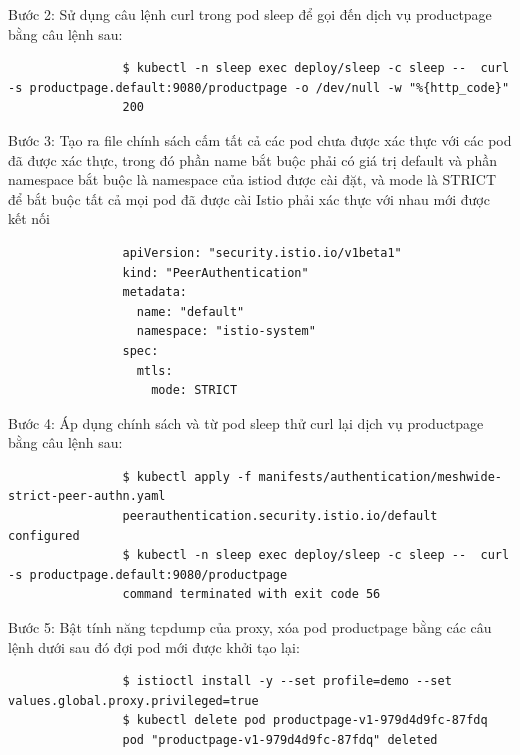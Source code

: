 \documentclass[12pt,a4paper]{report}
\begin{document}
{{				Bước 2: Sử dụng câu lệnh curl trong pod sleep để gọi đến dịch vụ productpage bằng câu lệnh sau:
				\begin{lstlisting}
				$ kubectl -n sleep exec deploy/sleep -c sleep --  curl -s productpage.default:9080/productpage -o /dev/null -w "%{http_code}"
				200
				\end{lstlisting}
				
				Bước 3: Tạo ra file chính sách cấm tất cả các pod chưa được xác thực với các pod đã được xác thực, trong đó phần name bắt buộc phải có giá trị default và phần namespace bắt buộc là namespace của istiod được cài đặt, và mode là STRICT để bắt buộc tất cả mọi pod đã được cài Istio phải xác thực với nhau mới được kết nối
				\begin{lstlisting}
				apiVersion: "security.istio.io/v1beta1"
				kind: "PeerAuthentication"
				metadata:
				  name: "default"
				  namespace: "istio-system"
				spec:
			 	  mtls:
				    mode: STRICT 
				\end{lstlisting}
				
				Bước 4: Áp dụng chính sách và từ pod sleep thử curl lại dịch vụ productpage bằng câu lệnh sau:
				\begin{lstlisting}
				$ kubectl apply -f manifests/authentication/meshwide-strict-peer-authn.yaml 
				peerauthentication.security.istio.io/default configured
				$ kubectl -n sleep exec deploy/sleep -c sleep --  curl -s productpage.default:9080/productpage
				command terminated with exit code 56
				\end{lstlisting}
				
				Bước 5: Bật tính năng tcpdump của proxy, xóa pod productpage  bằng các câu lệnh dưới sau đó đợi pod mới được khởi tạo lại:
				\begin{lstlisting}
				$ istioctl install -y --set profile=demo --set values.global.proxy.privileged=true
				$ kubectl delete pod productpage-v1-979d4d9fc-87fdq
				pod "productpage-v1-979d4d9fc-87fdq" deleted
				\end{lstlisting}
				
}}
\end{document}
